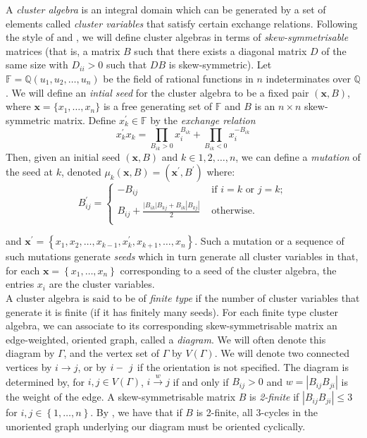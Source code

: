 \documentclass[11pt]{amsart}
\theoremstyle{definition}
\newcommand\V{V(\Gamma)}
\begin{document}
A \textit{cluster algebra} is an integral domain which can be generated by a set of elements called \textit{cluster variables} that satisfy certain exchange relations. Following the style of \cite{FZ02} and \cite{BM13}, we will define cluster algebras in terms of \textit{skew-symmetrisable} matrices (that is, a matrix $B$ such that there exists a diagonal matrix $D$ of the same size with $D_{ii} >0$ such that $DB$ is skew-symmetric). Let $\mathbb{F} = \mathbb{Q}(u_1, u_2, \ldots, u_n)$ be the field of rational functions in $n$ indeterminates over $\mathbb{Q}$. We will define an \textit{intial seed} for the cluster algebra to be a fixed pair $(\textbf{x}, B)$, where $\textbf{x} = \{x_1, \ldots, x_n\}$ is a free generating set of $\mathbb{F}$ and $B$ is an $n \times n$ skew-symmetric matrix. Define $x_k^{\prime} \in \mathbb{F}$ by the \textit{exchange relation}
\begin{displaymath}
x_k^{\prime}x_k = \prod_{B_{ik} > 0}{x_i^{B_{ik}}} + \prod_{B_{ik} < 0}{x_i^{-B_{ik}}}
\end{displaymath}
Then, given an initial seed $(\textbf{x}, B)$ and $k \in {1,2,\ldots,n}$, we can define a \textit{mutation} of the seed at $k$, denoted $\mu_k(\boldsymbol{x}, B) = (\textbf{x}^{\prime}, B^{\prime})$ where:
\begin{displaymath}
B_{ij}^{\prime} = \begin{cases} - B_{ij} & \mbox{ if } i = k \mbox{ or } j = k;\\
B_{ij} + \frac{|B_{ik}|B_{kj} + B_{ik}|B_{kj}|}{2} & \mbox{ otherwise. }\\
\end{cases}
\end{displaymath}

and $\textbf{x}^{\prime} = \left\{ x_1, x_2, \ldots, x_{k-1}, x_k^{\prime}, x_{k+1}, \ldots, x_n \right\}$.
Such a mutation or a sequence of such mutations generate \textit{seeds} which in turn generate all cluster variables in that, for each $\textbf{x} = \left\{ x_1, \ldots, x_n \right\}$ corresponding to a seed of the cluster algebra, the entries $x_i$ are the cluster variables. \\

 A cluster algebra is said to be of \textit{finite type} if the number of cluster variables that generate it is finite (if it has finitely many seeds). For each finite type cluster algebra, we can associate to its corresponding skew-symmetrisable matrix an edge-weighted, oriented graph, called a \textit{diagram}. We will often denote this diagram by $\Gamma$, and the vertex set of $\Gamma$ by $\V$. We will denote two connected vertices by $i \rightarrow j$, or by $i\--\ j$ if the orientation is not specified. The diagram is determined by, for $i, j \in \V$, $i \xrightarrow{w} j$ if and only if $B_{ij} > 0$ and $w = |B_{ij}B_{ji}|$ is the weight of the edge. A skew-symmetrisable matrix $B$ is \textit{2-finite} if $|B_{ij}B_{ji}| \leq 3$ for $i, j \in \left\{ 1, \ldots, n \right\}$. By \cite[7.5]{FZ02}, we have that if $B$ is 2-finite, all 3-cycles in the unoriented graph underlying our diagram must be oriented cyclically. \\
\end{document}

